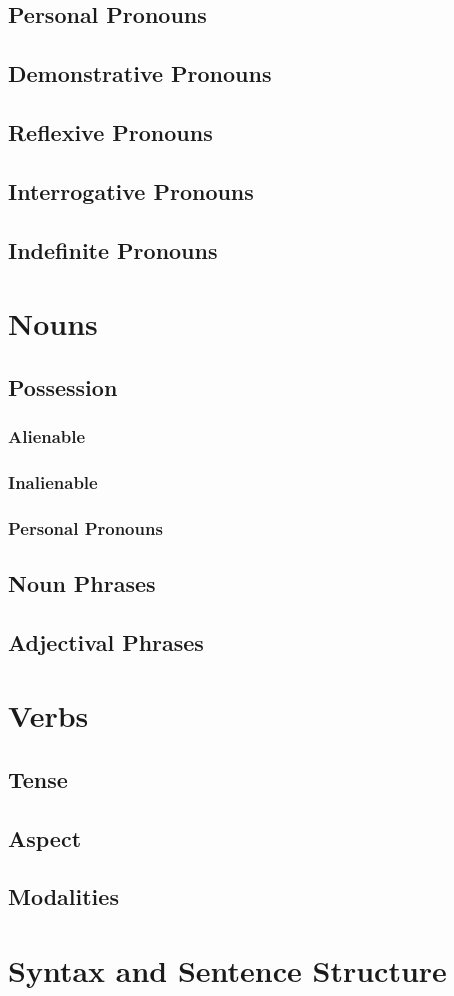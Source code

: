 \documentclass[10pt]{article}
\begin{document}
	\subsection{Personal Pronouns}
	\subsection{Demonstrative Pronouns}
	\subsection{Reflexive Pronouns}
	\subsection{Interrogative Pronouns}
	\subsection{Indefinite Pronouns}
\section{Nouns}
	\subsection{Possession}
		\subsubsection{Alienable}
		\subsubsection{Inalienable}
		\subsubsection{Personal Pronouns}
	\subsection{Noun Phrases}
	\subsection{Adjectival Phrases}
\section{Verbs}
	\subsection{Tense}
	\subsection{Aspect}
	\subsection{Modalities}
\section{Syntax and Sentence Structure}
		


\pagebreak

\begin{thebibliography}{99}
	
    
\end{thebibliography}
\end{document}
